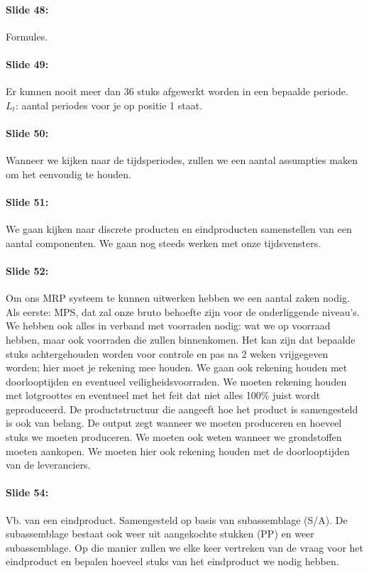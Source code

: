 \documentclass[10pt,a4paper]{report}
\begin{document}
\paragraph{Slide 48:} Formules.

\paragraph{Slide 49:} Er kunnen nooit meer dan 36 stuks afgewerkt worden in een bepaalde periode. \\
$L_{t}$: aantal periodes voor je op positie 1 staat.

\paragraph{Slide 50:} Wanneer we kijken naar de tijdsperiodes, zullen we een aantal assumpties maken om het eenvoudig te houden. 

\paragraph{Slide 51:} We gaan kijken naar discrete producten en eindproducten samenstellen van een aantal componenten. We gaan nog steeds werken met onze tijdsvensters.

\paragraph{Slide 52:} Om ons MRP systeem te kunnen uitwerken hebben we een aantal zaken nodig. Als eerste: MPS, dat zal onze bruto behoefte zijn voor de onderliggende niveau's. We hebben ook alles in verband met voorraden nodig: wat we op voorraad hebben, maar ook voorraden die zullen binnenkomen. Het kan zijn dat bepaalde stuks achtergehouden worden voor controle en pas na 2 weken vrijgegeven worden; hier moet je rekening mee houden.
We gaan ook rekening houden met doorlooptijden en eventueel veiligheidsvoorraden. We moeten rekening houden met lotgroottes en eventueel met het feit dat niet alles 100\% juist wordt geproduceerd. De productstructuur die aangeeft hoe het product is samengesteld is ook van belang. De output zegt wanneer we moeten produceren en hoeveel stuks we moeten produceren. We moeten ook weten wanneer we grondstoffen moeten aankopen. We moeten hier ook rekening houden met de doorlooptijden van de leveranciers.

\paragraph{Slide 54:} Vb. van een eindproduct. Samengesteld op basis van subassemblage (S/A). De subassemblage bestaat ook weer uit aangekochte stukken (PP) en weer subassemblage. Op die manier zullen we elke keer vertreken van de vraag voor het eindproduct en bepalen hoeveel stuks van het eindproduct we nodig hebben.
\end{document}
